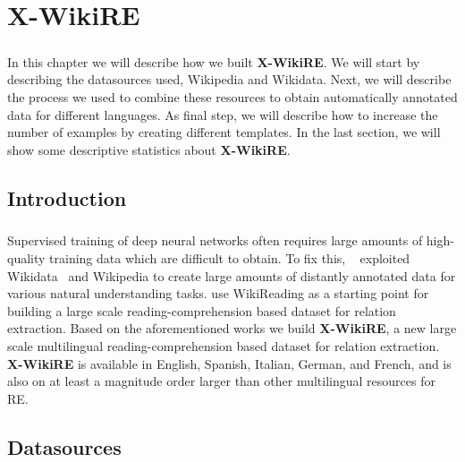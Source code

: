 \chapter{X-WikiRE}
\label{chpt:4}
\paragraph{}
In this chapter we will describe how we built \textbf{X-WikiRE}. We will start by describing the datasources used, Wikipedia and Wikidata. Next, we will describe the process we used to combine these resources to obtain automatically annotated data for different languages. As final step, we will describe how to increase the number of examples by creating different templates. In the last section, we will show some descriptive statistics about \textbf{X-WikiRE}.

\section{Introduction}
\paragraph{}
Supervised training of deep neural networks often requires large amounts of high-quality training data which are difficult to obtain.  To fix this, ~\cite{hewlett2016wikireading} exploited Wikidata~\citep{vwikidata} and Wikipedia to create large amounts of distantly annotated data for various natural understanding tasks. \cite{levy2017zero} use WikiReading as a starting point for building a large scale reading-comprehension based dataset for relation extraction. Based on the aforementioned  works we build \textbf{X-WikiRE}, a new large scale multilingual reading-comprehension based dataset for relation extraction. \textbf{X-WikiRE} is available in English, Spanish, Italian, German, and French, and is also on at least a magnitude order larger than other multilingual resources for RE.

\section{Datasources}
